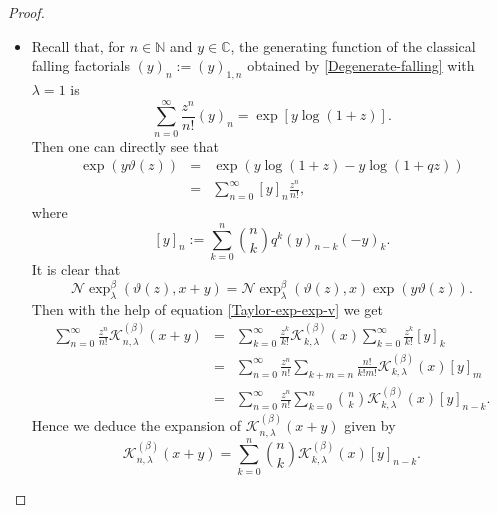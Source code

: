 \documentclass[10pt,a4paper]{amsart}
\begin{document}
\begin{proof}
\begin{itemize}
$${{\xi_{q})^{(k)}(0)}{k!}z^{k}},$$ we obtain
$$\begin{array}{lll}
\displaystyle{\sum^{\infty}_{n=0}\frac{z^{n}}{n!}\mathcal{K}^{(\beta)}_{n,
\lambda}(x+y)}
&=&\displaystyle{\sum^{\infty}_{k=0}\frac{z^{k}}{k!}\mathcal{K}^{(\beta)}_{k,
\lambda}(x)
\sum^{\infty}_{l=0}\frac{z^{l}}{l!}\mathcal{K}^{(\beta)}_{l,
\lambda}(y)
\sum^{\infty}_{m=0}\frac{z^{m}}{m!}\mathcal{K}^{(\beta)}_{m, \lambda}(x)}\\
&=&\displaystyle{\sum^{\infty}_{n=0}\frac{z^{n}}{n!}\sum_{k+l+m=n}
\frac{n!}{k!l!m!}\mathcal{K}^{(\beta)}_{k,
\lambda}(x)\mathcal{K}^{(\beta)}_{l,
\lambda}(x)(e^{\beta}_{\lambda}\circ \xi_{q})^{(m)}(0)}.
\end{array}$$
This gives the statement.
\item [\textbf{(P4)}]
Recall that, for $n\in \mathbb{N}$ and  $y\in \mathbb{C}$, the
generating function of the classical falling factorials
$(y)_{n}:=(y)_{1, n}$ obtained by \eqref{Degenerate-falling} with
$\lambda=1$ is
$$
\displaystyle{\sum^{\infty}_{n=0}\frac{z^{n}}{n!}(y)_{n}=\exp[y\log(1+z)]}.
$$
Then one can directly see that
\begin{eqnarray}\label{Taylor-exp-exp-v}
\exp(y\vartheta(z))&=&\exp(y\log(1+z)-y\log(1+qz))\nonumber\\
&=&\displaystyle{\sum^{\infty}_{n=0}[y]_{n}\frac{z^{n}}{n!}},
\end{eqnarray}
where
$$
[y]_{n}:=\displaystyle{\sum^{n}_{k=0}\binom{n}{k}q^{k}(y)_{n-k}(-y)_{k}}.
$$
It is clear that
$$\mathcal{N}\!\exp^{\beta}_{\lambda}(\vartheta(z), x+y)=\mathcal{N}\!\exp^{\beta}_{\lambda}(\vartheta(z), x)\exp(y\vartheta(z)).$$
Then with the help of equation \eqref{Taylor-exp-exp-v} we get
$$\begin{array}{lll}
\displaystyle{\sum^{\infty}_{n=0}\frac{z^{n}}{n!}\mathcal{K}^{(\beta)}_{n,
\lambda}(x+y)}&=&
\displaystyle{\sum^{\infty}_{k=0}\frac{z^{k}}{k!}\mathcal{K}^{(\beta)}_{k, \lambda}(x)\sum^{\infty}_{k=0}\frac{z^{k}}{k!}[y]_{k}}\\
&=&\displaystyle{\sum^{\infty}_{n=0}\frac{z^{n}}{n!}\sum_{k+m=n}\frac{n!}{k!m!}\mathcal{K}^{(\beta)}_{k, \lambda}(x)[y]_{m}}\\
&=&\displaystyle{\sum^{\infty}_{n=0}\frac{z^{n}}{n!}\sum^{n}_{k=0}
\binom{n}{k}\mathcal{K}^{(\beta)}_{k, \lambda}(x)[y]_{n-k}}.
\end{array}$$
Hence we deduce the expansion of $\mathcal{K}^{(\beta)}_{n,
\lambda}(x+y)$ given by
$$\mathcal{K}^{(\beta)}_{n, \lambda}(x+y)=\displaystyle{\sum^{n}_{k=0}
\binom{n}{k} \mathcal{K}^{(\beta)}_{k, \lambda}(x)[y]_{n-k}}.$$
\end{itemize}
\end{proof}
\end{document}
